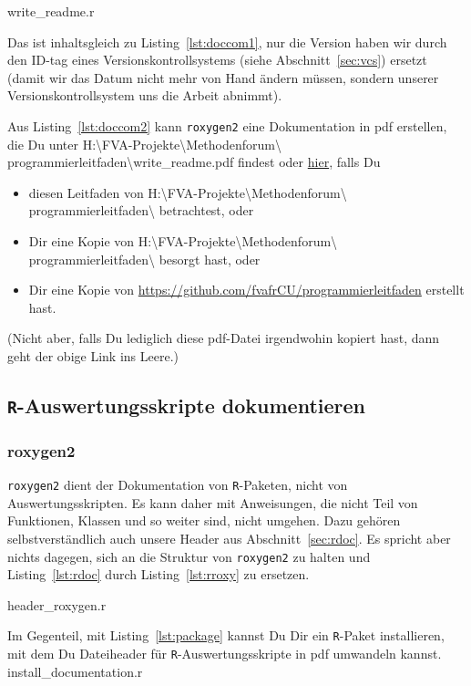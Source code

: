 \documentclass[twoside]{scrreprt}
\providecommand{\R}{\texttt{R}}
\providecommand{\code}[1]{\texttt{#1}}
\providecommand{\proot}{%
H:\textbackslash{}FVA-Projekte\textbackslash{}Methodenforum\textbackslash{}%
}
\providecommand{\pdir}{\proot{}programmierleitfaden\textbackslash{}}
\begin{document}
%
{write_readme.r}

Das ist inhaltsgleich zu  Listing~\ref{lst:doccom1}, nur die Version haben wir
durch den ID-tag eines Versionskontrollsystems (siehe Abschnitt~\ref{sec:vcs})
ersetzt (damit wir das Datum nicht mehr von Hand
\"a{}ndern m\"u{}ssen, sondern unserer Versionskontrollsystem uns die Arbeit
abnimmt).

Aus Listing~\ref{lst:doccom2}  kann \code{roxygen2} eine Dokumentation in pdf
erstellen, die Du unter \pdir{}write\_readme.pdf findest oder
\href{write_readme.pdf}{hier\label{page:links}}, falls Du  
\begin{itemize}
    \item diesen Leitfaden von \pdir{} betrachtest, oder 
    \item Dir eine Kopie von \pdir{} besorgt hast, oder 
    \item Dir eine Kopie von 
        \url{https://github.com/fvafrCU/programmierleitfaden} erstellt hast.
\end{itemize}
(Nicht aber, falls Du lediglich diese pdf-Datei irgendwohin kopiert hast, dann 
geht der obige Link ins Leere.)

\subsection{\R{}-Auswertungsskripte dokumentieren
\label{sec:documentation}}
\subsubsection{roxygen2}
\code{roxygen2} dient der Dokumentation von \R{}-Paketen, nicht von
Auswertungsskripten. Es kann daher mit Anweisungen, die nicht Teil von
Funktionen, Klassen und so weiter sind, nicht umgehen. Dazu geh\"oren
selbstverst\"a{}ndlich auch unsere Header aus Abschnitt~\ref{sec:rdoc}.
Es spricht aber nichts dagegen, sich an die Struktur von \code{roxygen2} zu
halten und Listing~\ref{lst:rdoc} durch Listing~\ref{lst:rroxy} zu ersetzen.

{header_roxygen.r}

Im Gegenteil, mit Listing~\ref{lst:package} kannst Du Dir ein \R{}-Paket
installieren, mit dem Du
Dateiheader
f\"u{}r \R{}-Auswertungsskripte in pdf
umwandeln
kannst.
%
{install_documentation.r}
\end{document}
